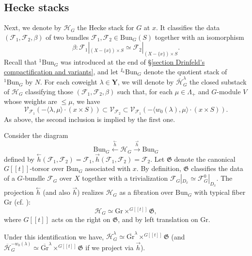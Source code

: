 \documentclass[11pt]{amsart}
\theoremstyle{plain}
\theoremstyle{remark}
\numberwithin{equation}{section}
\begin{document}
	\subsection{Hecke stacks} Next, we denote by $\mathcal{H}_{G}$ the Hecke stack for $G$ at $x$. It classifies the data $(\mathcal{F}_1,\mathcal{F}_2,\beta)$ of two bundles $\mathcal{F}_1,\mathcal{F}_2\in\mathrm{Bun}_G(S)$ together with an isomorphism $$\beta:\mathcal{F}_1|_{(X-\{x\})\times S}\simeq \mathcal{F}_2|_{(X-\{x\})\times S}.$$
	Recall that $^{1}\mathrm{Bun}_G$ was introduced at the end of §\ref{section Drinfeld's compactification and variants}, and let $^{I_\mathrm{u}}\mathrm{Bun}_G$ denote the quotient stack of $^{1}\mathrm{Bun}_G$ by $N$. For each coweight $\lambda\in\mathbf{Y}$, we will denote by $\overline{\mathcal{H}}_{G}^\lambda$ the closed substack of $\mathcal{H}_{G}$ classifying those $(\mathcal{F}_1,\mathcal{F}_2,\beta)$ such that, for each $\mu\in\Lambda_+$ and $G$-module $V$ whose weights are $\leq\mu$, we have
	$$\mathcal{V}_{\mathcal{F}_1}(-\langle\lambda,\mu\rangle\cdot(x\times S))\subset \mathcal{V}_{\mathcal{F}_2}\subset  \mathcal{V}_{\mathcal{F}_1}(-\langle w_0(\lambda),\mu\rangle\cdot(x\times S)).$$
	As above, the second inclusion is implied by the first one.
	
	Consider the diagram
	$$\mathrm{Bun}_G\xleftarrow{\overset{\leftarrow}{h}}\mathcal{H}_{G}\xrightarrow{\overset{\rightarrow}{h}}\mathrm{Bun}_G $$
	defined by $\overset{\leftarrow}{h}(\mathcal{F}_1,\mathcal{F}_2)=\mathcal{F}_1,\overset{\rightarrow}{h}(\mathcal{F}_1,\mathcal{F}_2)=\mathcal{F}_2$. Let $\mathfrak{G}$ denote the canonical $G[[t]]$-torsor over $\mathrm{Bun}_G$ associated with $x$. By definition, $\mathfrak{G}$ classifies the data of a $G$-bundle $\mathcal{F}_G$ over $X$ together with a trivialization $\mathcal{F}_G|_{D_x}\simeq\mathcal{F}^0_G|_{D_x}$. The projection $\overset{\leftarrow}{h}$ (and also $\overset{\rightarrow}{h}$) realizes $\mathcal{H}_{G}$ as a fibration over $\mathrm{Bun}_G$ with typical fiber $\mathrm{Gr}$ (cf. \cite[§3.2.4]{BG}):
	$$\mathcal{H}_{G}\simeq \mathrm{Gr}\times^{G[[t]]}\mathfrak{G}, $$
 where $G[[t]]$ acts on the right on $\mathfrak{G}$, and by left translation on $\mathrm{Gr}$.
 
	Under this identification we have, $\overline{\mathcal{H}}_{G}^\lambda\simeq \overline{\mathrm{Gr}}^\lambda\times^{G[[t]]}\mathfrak{G}$ (and $\overline{\mathcal{H}}_{G}^{-w_0(\lambda)}\simeq \overline{\mathrm{Gr}}^\lambda\times^{G[[t]]}\mathfrak{G}$ if we project via $\overset{\rightarrow}{h}$). 
	
\end{document}
